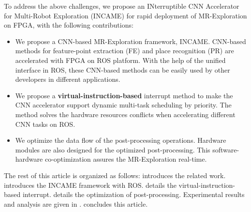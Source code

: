 To address the above challenges, we propose an INterruptible CNN Accelerator for Multi-Robot Exploration (INCAME) for rapid deployment of MR-Exploration on FPGA, with the following contributions:

\begin{itemize}
\item We propose a CNN-based MR-Exploration framework, INCAME. CNN-based methods for feature-point extraction (FE) and place recognition (PR) are accelerated with FPGA on ROS platform\cite{quigley2009ros}. With the help of the unified interface in ROS, these CNN-based methods can be easily used by other developers in different applications.
\item We propose a \textbf{virtual-instruction-based} interrupt method to make the CNN accelerator support dynamic multi-task scheduling by priority. The method solves the hardware resources conflicts when accelerating different CNN tasks on ROS.
\item We optimize the data flow of the post-processing operations. Hardware modules are also designed for the optimized post-processing. This software-hardware co-optimization assures the MR-Exploration real-time.
\end{itemize}

The rest of this article is organized as follows:  introduces the related work.  introduces the INCAME framework with ROS.  details the {virtual-instruction-based} interrupt.  details the optimization of post-processing.  Experimental results and analysis are given in .  concludes this article.